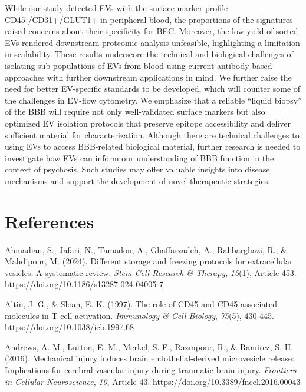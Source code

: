 \documentclass[authordate, empirical]{jote-new-article}
\begin{document}
	While our study detected EVs with the surface marker profile CD45-/CD31+/GLUT1+ in peripheral blood, the proportions of the signatures raised concerns about their specificity for BEC. Moreover, the low yield of sorted EVs rendered downstream proteomic analysis unfeasible, highlighting a limitation in scalability. These results underscore the technical and biological challenges of isolating sub-populations of EVs from blood using current antibody-based approaches with further downstream applications in mind. We further raise the need for better EV-specific standards to be developed, which will counter some of the challenges in EV-flow cytometry. We emphasize that a reliable “liquid biopsy” of the BBB will require not only well-validated surface markers but also optimized EV isolation protocols that preserve epitope accessibility and deliver sufficient material for characterization. Although there are technical challenges to using EVs to access BBB-related biological material, further research is needed to investigate how EVs can inform our understanding of BBB function in the context of psychosis. Such studies may offer valuable insights into disease mechanisms and support the development of novel therapeutic strategies.







	\section{References}



	Ahmadian, S., Jafari, N., Tamadon, A., Ghaffarzadeh, A., Rahbarghazi, R., \& Mahdipour, M. (2024). Different storage and freezing protocols for extracellular vesicles: A systematic review. \emph{Stem Cell Research \& Therapy},\emph{ 15}(1), Article 453. \href{https://doi.org/10.1186/s13287-024-04005-7}{https://doi.org/10.1186/s13287-024-04005-7}



	Altin, J. G., \& Sloan, E. K. (1997). The role of CD45 and CD45-associated molecules in T cell activation. \emph{Immunology \& Cell Biology},\emph{ 75}(5), 430-445. \href{https://doi.org/10.1038/icb.1997.68}{https://doi.org/10.1038/icb.1997.68}



	Andrews, A. M., Lutton, E. M., Merkel, S. F., Razmpour, R., \& Ramirez, S. H. (2016). Mechanical injury induces brain endothelial-derived microvesicle release: Implications for cerebral vascular injury during traumatic brain injury. \emph{Frontiers in Cellular Neuroscience},\emph{ 10}, Article 43. \href{https://doi.org/10.3389/fncel.2016.00043}{https://doi.org/10.3389/fncel.2016.00043}
\end{document}
